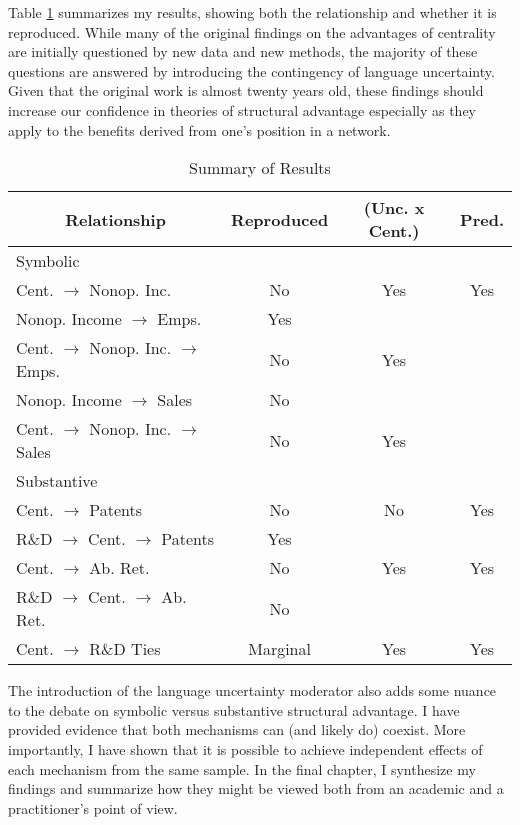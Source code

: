 Table \ref{summary} summarizes my results, showing both the relationship and whether it is reproduced. While many of the original findings on the advantages of centrality are initially questioned by new data and new methods, the majority of these questions are answered by introducing the contingency of language uncertainty. Given that the original work is almost twenty years old, these findings should increase our confidence in theories of structural advantage especially as they apply to the benefits derived from one's position in a network.

\begin{table}[htbp]\centering \caption{Summary of Results\label{summary}}
\begin{tabular}{l  c  c  c  }\hline\hline
\multicolumn{1}{c}{Relationship} & Reproduced & (Unc. x Cent.) & Pred. \\ \hline
Symbolic \\ \hline
Cent. $\rightarrow$ Nonop. Inc. & No & Yes & Yes\\
Nonop. Income $\rightarrow$ Emps. & Yes\\
Cent. $\rightarrow$ Nonop. Inc. $\rightarrow$ Emps. & No & Yes\\
Nonop. Income $\rightarrow$ Sales & No\\
Cent. $\rightarrow$ Nonop. Inc. $\rightarrow$ Sales & No & Yes\\
\hline
Substantive \\ \hline
Cent. $\rightarrow$ Patents & No & No & Yes\\
R\&D $\rightarrow$ Cent. $\rightarrow$ Patents & Yes\\
Cent. $\rightarrow$ Ab. Ret. & No & Yes & Yes\\
R\&D $\rightarrow$ Cent. $\rightarrow$ Ab. Ret. & No\\
Cent. $\rightarrow$ R\&D Ties & Marginal & Yes & Yes\\
\hline \hline 
 \end{tabular}
\end{table}

The introduction of the language uncertainty moderator also adds some nuance to the debate on symbolic versus substantive structural advantage. I have provided evidence that both mechanisms can (and likely do) coexist. More importantly, I have shown that it is possible to achieve independent effects of each mechanism from the same sample. In the final chapter, I synthesize my findings and summarize how they might be viewed both from an academic and a practitioner's point of view.

